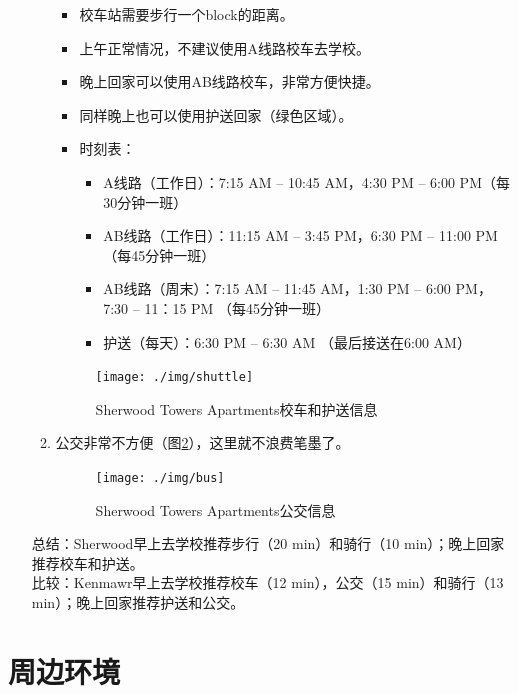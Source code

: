 \documentclass[nofonts,a4paper,11pt]{article}
\begin{document}
\begin{itemize}
\begin{enumerate}
		\begin{itemize}
			\item 校车站需要步行一个block的距离。
			\item 上午正常情况，不建议使用A线路校车去学校。
			\item 晚上回家可以使用AB线路校车，非常方便快捷。
			\item 同样晚上也可以使用护送回家（绿色区域）。
			\item 时刻表：
			\begin{itemize}
				\item A线路（工作日）：7:15 AM -- 10:45 AM，4:30 PM -- 6:00 PM（每30分钟一班）
				\item AB线路（工作日）：11:15 AM -- 3:45 PM，6:30 PM -- 11:00 PM（每45分钟一班）
				\item AB线路（周末）：7:15 AM -- 11:45 AM，1:30 PM -- 6:00 PM，7:30 -- 11：15 PM （每45分钟一班）
				\item 护送（每天）：6:30 PM -- 6:30 AM （最后接送在6:00 AM）
			\end{itemize}
		\end{itemize}
		\begin{figure}[!h]
			\centering
			\texttt{[image: ./img/shuttle]}
			\caption{Sherwood Towers Apartments校车和护送信息}
			\label{fig:shuttle}
		\end{figure}
		\item 公交非常不方便（图\ref{fig:bus}），这里就不浪费笔墨了。
		\begin{figure}[!h]
			\centering
			\texttt{[image: ./img/bus]}
			\caption{Sherwood Towers Apartments公交信息}
			\label{fig:bus}
		\end{figure}
	\end{enumerate}
	总结：Sherwood早上去学校推荐步行（20 min）和骑行（10 min）；晚上回家推荐校车和护送。\\
	比较：Kenmawr早上去学校推荐校车（12 min），公交（15 min）和骑行（13 min）；晚上回家推荐护送和公交。
\end{itemize}

\section{周边环境}
\end{document}
